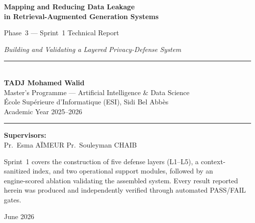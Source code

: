 \documentclass[11pt,a4paper]{article}
\title{}
\author{}
\date{}
\begin{document}
\begin{titlepage}
\centering
\vspace*{1.4cm}

{\LARGE\bfseries Mapping and Reducing Data Leakage\\[6pt]
in Retrieval-Augmented Generation Systems\par}
\vspace{0.6cm}
{\Large Phase~3 --- Sprint~1 Technical Report\par}
\vspace{0.3cm}
{\large\itshape Building and Validating a Layered Privacy-Defense System\par}

\vspace{1.4cm}
\rule{0.78\textwidth}{0.5pt}\\[8pt]
{\large\bfseries TADJ Mohamed Walid}\\[4pt]
{\normalsize Master's Programme --- Artificial Intelligence \& Data Science}\\
{\normalsize \'Ecole Sup\'erieure d'Informatique (ESI), Sidi Bel Abb\`es}\\
{\normalsize Academic Year 2025--2026}\\[6pt]
\rule{0.78\textwidth}{0.5pt}

\vspace{0.9cm}
{\normalsize\textbf{Supervisors:}\\[2pt]
Pr.\ Esma A\"IMEUR \quad\textbullet\quad Pr.\ Souleyman CHAIB}

\vfill
{\small Sprint~1 covers the construction of five defense layers (L1--L5), a
context-sanitized index, and two operational support modules, followed by an\\
engine-scored ablation validating the assembled system. Every result reported\\
herein was produced and independently verified through automated PASS/FAIL gates.\par}
\vspace{0.5cm}
{\small June 2026}
\end{titlepage}
\end{document}
